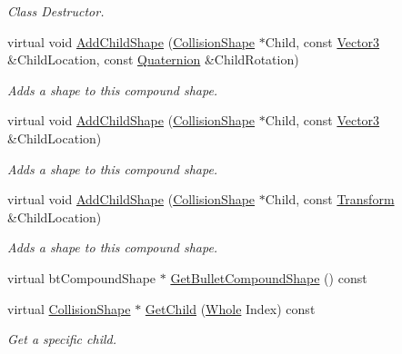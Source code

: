 \begin{DoxyCompactItemize}
\begin{DoxyCompactList}\small\item\em Class Destructor. \item\end{DoxyCompactList}\item 
virtual void \hyperlink{classMezzanine_1_1CompoundCollisionShape_a84fc66573ca4f052d53474a743305921}{AddChildShape} (\hyperlink{classMezzanine_1_1CollisionShape}{CollisionShape} $\ast$Child, const \hyperlink{classMezzanine_1_1Vector3}{Vector3} \&ChildLocation, const \hyperlink{classMezzanine_1_1Quaternion}{Quaternion} \&ChildRotation)
\begin{DoxyCompactList}\small\item\em Adds a shape to this compound shape. \item\end{DoxyCompactList}\item 
virtual void \hyperlink{classMezzanine_1_1CompoundCollisionShape_af4549334b9423e12eb36b48015956b7d}{AddChildShape} (\hyperlink{classMezzanine_1_1CollisionShape}{CollisionShape} $\ast$Child, const \hyperlink{classMezzanine_1_1Vector3}{Vector3} \&ChildLocation)
\begin{DoxyCompactList}\small\item\em Adds a shape to this compound shape. \item\end{DoxyCompactList}\item 
virtual void \hyperlink{classMezzanine_1_1CompoundCollisionShape_a9f6234a1d1bdcf96c2699df57b0ab7f8}{AddChildShape} (\hyperlink{classMezzanine_1_1CollisionShape}{CollisionShape} $\ast$Child, const \hyperlink{classMezzanine_1_1Transform}{Transform} \&ChildLocation)
\begin{DoxyCompactList}\small\item\em Adds a shape to this compound shape. \item\end{DoxyCompactList}\item 
virtual btCompoundShape $\ast$ \hyperlink{classMezzanine_1_1CompoundCollisionShape_adcf3f393c1be71c3ffb50782c375ea57}{GetBulletCompoundShape} () const 
\item 
virtual \hyperlink{classMezzanine_1_1CollisionShape}{CollisionShape} $\ast$ \hyperlink{classMezzanine_1_1CompoundCollisionShape_a707e6da7fef980a55f9c6477f152d0a9}{GetChild} (\hyperlink{namespaceMezzanine_adcbb6ce6d1eb4379d109e51171e2e493}{Whole} Index) const 
\begin{DoxyCompactList}\small\item\em Get a specific child. \item\end{DoxyCompactList}\item 

\end{DoxyCompactItemize}
